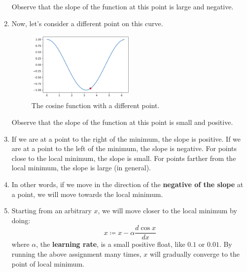 \documentclass{article}
\begin{document}
\begin{enumerate}
\begin{figure}[H]
\begin{center}
                \end{center} \end{figure}
                Observe that the slope of the function at this point is large and negative.
                \item Now, let's consider a different point on this curve.
                \begin{figure}[H] \begin{center}
                    \includegraphics[width = 0.5\textwidth]{plot5.png}
                    \caption{The cosine function with a  different point.}
                \end{center} \end{figure}
                Observe that the slope of the function at this point is small and positive.
                \item If we are at a point to the right of the minimum, the slope is positive.
                If we are at a point to the left of the minimum, the slope is negative.
                For points close to the local minimum, the slope is small.
                For points farther from the local minimum, the slope is large (in general).
                \item In other words, if we move in the direction of the \textbf{negative of the 
                slope} at a point, we will move towards the local minimum.
                \item Starting from an arbitrary $x$, we will move closer to the local minimum by doing:
                \[
                    x \coloneqq x - \alpha\frac {d \cos x}{dx} 
                \]
                where $\alpha$, the \textbf{learning rate}, is a small positive float, like $0.1$ or $0.01$. By running the above assignment
                many times, $x$ will gradually converge to the point of local minimum.


\end{enumerate}
\end{document}
